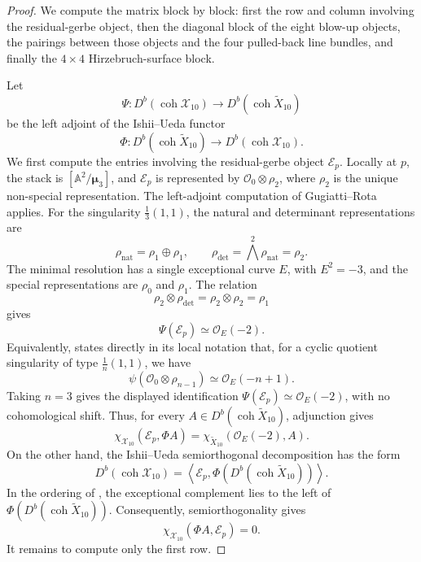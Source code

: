 \documentclass[11pt]{article}
\theoremstyle{plain}
\theoremstyle{definition}
\theoremstyle{remark}
\newcommand{\A}{\mathbb A}
\newcommand{\coh}{\operatorname{coh}}
\newcommand{\muthree}{\boldsymbol{\mu}_3}
\newcommand{\OO}{\mathcal O}
\begin{document}
\begin{proof}
We compute the matrix block by block: first the row and column involving the
residual-gerbe object, then the diagonal block of the eight blow-up objects,
the pairings between those objects and the four pulled-back line bundles,
and finally the \(4\times4\) Hirzebruch-surface block.

Let
\[
\Psi:D^b(\coh \mathcal X_{10})\longrightarrow D^b(\coh \widetilde X_{10})
\]
be the left adjoint of the Ishii--Ueda functor
\[
\Phi:D^b(\coh \widetilde X_{10})\longrightarrow D^b(\coh \mathcal X_{10}).
\]
We first compute the entries involving the residual-gerbe object \(\mathcal E_p\). Locally at \(p\), the stack is \([\A^2/\muthree]\), and \(\mathcal E_p\) is represented by \(\OO_0\otimes\rho_2\), where \(\rho_2\) is the unique non-special representation. The left-adjoint computation of Gugiatti--Rota \cite[Theorem~3.1 and Example~3.5]{GugiattiRota2023} applies. For the singularity \(\frac13(1,1)\), the natural and determinant representations are
\[
\rho_{\mathrm{nat}}=\rho_1\oplus\rho_1,
\qquad
\rho_{\det}=\bigwedge^2\rho_{\mathrm{nat}}=\rho_2.
\]
The minimal resolution has a single exceptional curve \(E\), with \(E^2=-3\), and the special representations are \(\rho_0\) and \(\rho_1\). The relation
\[
\rho_2\otimes\rho_{\det}=\rho_2\otimes\rho_2=\rho_1
\]
gives
\[
\Psi(\mathcal E_p)\simeq \OO_E(-2).
\]
Equivalently, \cite[Example~3.5]{GugiattiRota2023} states directly in its
local notation that, for a cyclic quotient singularity of type
\(\frac1n(1,1)\), we have
\[
\psi(\OO_0\otimes\rho_{n-1})\simeq \OO_E(-n+1).
\]
Taking \(n=3\) gives the displayed identification
\(\Psi(\mathcal E_p)\simeq\OO_E(-2)\), with no cohomological shift.
Thus, for every \(A\in D^b(\coh\widetilde X_{10})\), adjunction gives
\[
\chi_{\mathcal X_{10}}(\mathcal E_p,\Phi A)
=
\chi_{\widetilde X_{10}}(\OO_E(-2),A).
\]
On the other hand, the Ishii--Ueda semiorthogonal decomposition has the form
\[
D^b(\coh\mathcal X_{10})
=
\left\langle
\mathcal E_p,\Phi(D^b(\coh\widetilde X_{10}))
\right\rangle.
\]
In the ordering of \cite[Theorem~1.4]{Ishii2015}, the exceptional complement
lies to the left of \(\Phi(D^b(\coh\widetilde X_{10}))\). Consequently,
semiorthogonality gives
\[
\chi_{\mathcal X_{10}}(\Phi A,\mathcal E_p)=0.
\]
It remains to compute only the first row.


\end{proof}
\end{document}
